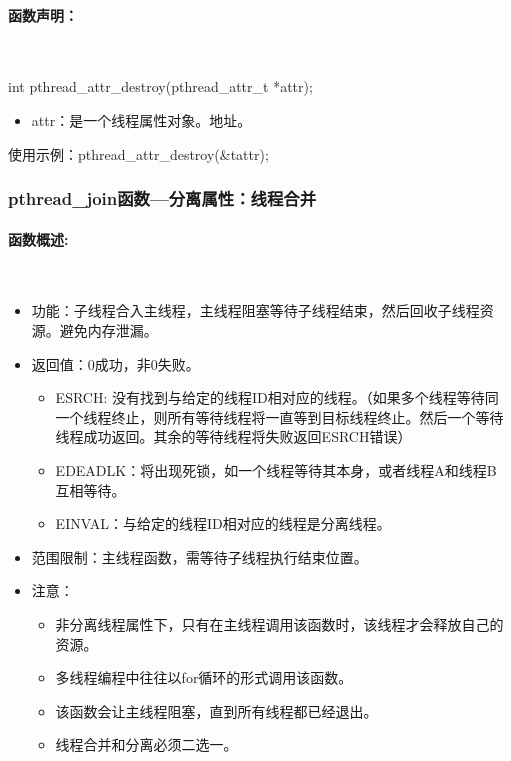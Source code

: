 \documentclass[UTF8]{article}%
\begin{document}
\paragraph{函数声明：}~{}

int pthread\_attr\_destroy(pthread\_attr\_t *attr);

\begin{itemize}
    \item attr：是一个线程属性对象。地址。
\end{itemize}

使用示例：pthread\_attr\_destroy(\&tattr);


\subsubsection{pthread\_join函数---分离属性：线程合并}

\paragraph{函数概述:}~{}

\begin{itemize}
    \item 功能：子线程合入主线程，主线程阻塞等待子线程结束，然后回收子线程资源。避免内存泄漏。
    \item 返回值：0成功，非0失败。
    {
        \begin{itemize}
            \item ESRCH: 没有找到与给定的线程ID相对应的线程。（如果多个线程等待同一个线程终止，则所有等待线程将一直等到目标线程终止。然后一个等待线程成功返回。其余的等待线程将失败返回ESRCH错误）
            \item EDEADLK：将出现死锁，如一个线程等待其本身，或者线程A和线程B 互相等待。
            \item EINVAL：与给定的线程ID相对应的线程是分离线程。
        \end{itemize}
    }
    \item 范围限制：主线程函数，需等待子线程执行结束位置。
    \item 注意：
    {
        \begin{itemize}
            \item 非分离线程属性下，只有在主线程调用该函数时，该线程才会释放自己的资源。
            \item 多线程编程中往往以for循环的形式调用该函数。
            \item 该函数会让主线程阻塞，直到所有线程都已经退出。
            \item 线程合并和分离必须二选一。
        \end{itemize}
    }
    
\end{itemize}
\end{document}
